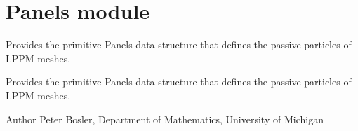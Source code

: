 \hypertarget{group___panels}{\section{Panels module}
\label{group___panels}
}


Provides the primitive Panels data structure that defines the passive particles of L\+P\+P\+M meshes.  


Provides the primitive Panels data structure that defines the passive particles of L\+P\+P\+M meshes. 

\begin{DoxyAuthor}{Author}
Peter Bosler, Department of Mathematics, University of Michigan 
\end{DoxyAuthor}
